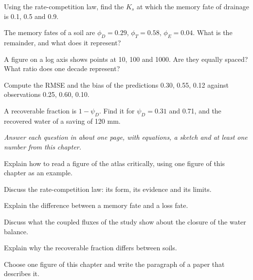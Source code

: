 \begin{exlist}
\item Using the rate-competition law, find the $K_s$ at which the memory fate of drainage is 0.1, 0.5 and 0.9.
\item The memory fates of a soil are $\phi_D=0.29$, $\phi_T=0.58$, $\phi_E=0.04$. What is the remainder, and what does it represent?
\item A figure on a log axis shows points at 10, 100 and 1000. Are they equally spaced? What ratio does one decade represent?
\item Compute the RMSE and the bias of the predictions 0.30, 0.55, 0.12 against observations 0.25, 0.60, 0.10.
\item A recoverable fraction is $1-\psi_D$. Find it for $\psi_D=0.31$ and 0.71, and the recovered water of a saving of 120 mm.
\end{exlist}
{\small\itshape Answer each question in about one page, with equations, a sketch and at least one number from this chapter.}\par\vspace{3pt}
\begin{exlist}
\item Explain how to read a figure of the atlas critically, using one figure of this chapter as an example.
\item Discuss the rate-competition law: its form, its evidence and its limits.
\item Explain the difference between a memory fate and a loss fate.
\item Discuss what the coupled fluxes of the study show about the closure of the water balance.
\item Explain why the recoverable fraction differs between soils.
\item Choose one figure of this chapter and write the paragraph of a paper that describes it.
\end{exlist}
